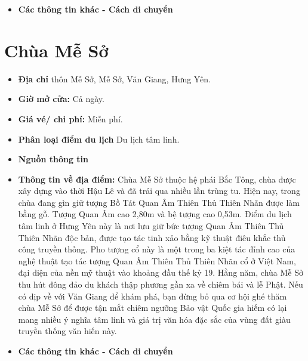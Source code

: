 \documentclass{article}
\begin{document}
\begin{itemize}
    \item{\textbf{Các thông tin khác - Cách di chuyển}} 
\end{itemize}

\section{Chùa Mễ Sở}
\begin{itemize}
    \item{\textbf{Địa chỉ}} thôn Mễ Sở, Mễ Sở, Văn Giang, Hưng Yên.

    \item{\textbf{Giờ mở cửa:}} Cả ngày.

    \item{\textbf{Giá vé/ chi phí:}} Miễn phí.

    \item{\textbf{Phân loại điểm du lịch}} Du lịch tâm linh.

    \item{\textbf{Nguồn thông tin}} 

    \item{\textbf{Thông tin về địa điểm:}} Chùa Mễ Sở thuộc hệ phái Bắc Tông, chùa được xây dựng vào thời Hậu Lê và đã trải qua nhiều lần trùng tu. Hiện nay, trong chùa đang gìn giữ tượng Bồ Tát Quan Âm Thiên Thủ Thiên Nhãn được làm bằng gỗ. Tượng Quan Âm cao 2,80m và bệ tượng cao 0,53m. Điểm du lịch tâm linh ở Hưng Yên này là nơi lưu giữ bức tượng Quan Âm Thiên Thủ Thiên Nhãn độc bản, được tạo tác tinh xảo bằng kỹ thuật điêu khắc thủ công truyền thống. Pho tượng cổ này là một trong ba kiệt tác đỉnh cao của nghệ thuật tạo tác tượng Quan Âm Thiên Thủ Thiên Nhãn cổ ở Việt Nam, đại diện của nền mỹ thuật vào khoảng đầu thế kỷ 19. Hằng năm, chùa Mễ Sở thu hút đông đảo du khách thập phương gần xa về chiêm bái và lễ Phật. Nếu có dịp về với Văn Giang để khám phá, bạn đừng bỏ qua cơ hội ghé thăm chùa Mễ Sở để được tận mắt chiêm ngưỡng Bảo vật Quốc gia hiếm có lại mang nhiều ý nghĩa tâm linh và giá trị văn hóa đặc sắc của vùng đất giàu truyền thống văn hiến này.
\end{itemize}

\begin{itemize}
    \item{\textbf{Các thông tin khác - Cách di chuyển}} 
\end{itemize}
\end{document}
